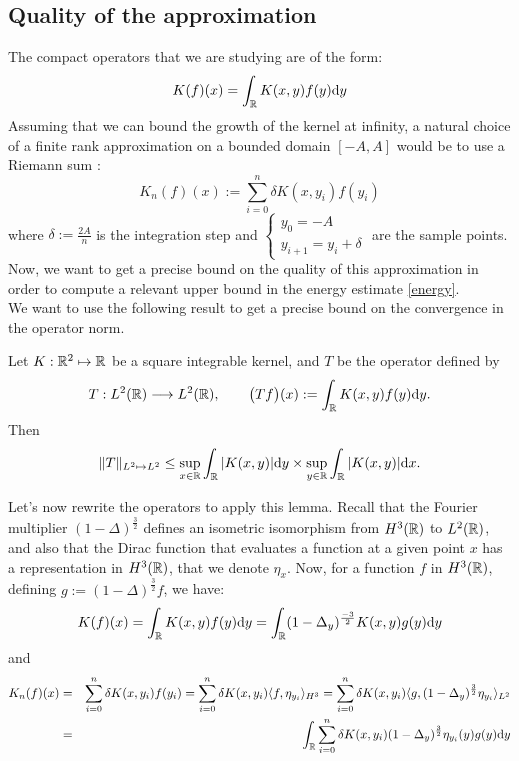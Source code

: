 \documentclass[11pt,a4paper]{article}
\begin{document}
\newpage

\subsection{ Quality of the approximation}
The compact operators that we are studying are of the form: \[K(f)(x) = \int_\mathbb R K(x,y)f(y)\mathrm{d}y \]
Assuming that we can bound the growth of the kernel at infinity, a natural choice of a finite rank approximation on a bounded domain $[-A,A]$ would be to use a Riemann sum : \[K_n(f)(x) := \sum_{i=0}^n \delta K(x,y_i)f(y_i)\]
where $\delta := \frac{2A}{n}$ is the integration step and $\begin{cases} y_0=-A \\ y_{i+1}=y_i + \delta \end{cases}$ are the sample points. \\

Now, we want to get a precise bound on the quality of this approximation in order to compute a relevant upper bound in the energy estimate \ref{energy}. \\
We want to use the following result to get a precise bound on the convergence in the operator norm.
\begin{lemma}\label{schur}
Let $K: \mathbb R^2 \mapsto \mathbb R$ be a square integrable kernel, and $T$ be the operator defined by 
\[ T: L^2(\mathbb R) \longrightarrow L^2(\mathbb R), \qquad \big(Tf\big)(x) := \int_{\mathbb R}K(x,y) f(y)\mathrm{d}y. \] 
Then \[\displaystyle \|T\|_{L^2\mapsto L^2} \leq \sup_{x\in \mathbb R} \int_\mathbb R |K(x,y)|\mathrm{d}y\times  \sup_{y\in \mathbb R} \int_\mathbb R |K(x,y)|\mathrm{d}x.\] 
\end{lemma}

Let's now rewrite the operators to apply this lemma. Recall that the Fourier multiplier $(1-\Delta)^\frac{3}{2}$ defines an isometric isomorphism from $H^3(\mathbb R)$ to $L^2(\mathbb R)$, and also that the Dirac function that evaluates a function at a given point $x$ has a representation in $H^3(\mathbb R)$, that we denote $\eta_x$. Now, for a function $f$ in $H^3(\mathbb R)$, defining $g:=(1-\Delta)^\frac{3}{2}f$, we have: 
\[K(f)(x) = \int_\mathbb R K(x,y)f(y)\mathrm{d}y = \int_\mathbb R(1-\Delta_y)^\frac{-3}{2} K(x,y)g(y)\mathrm{d}y\]
and 
\begin{eqnarray*}
K_n(f)(x) &=& \sum_{i=0}^n \delta K(x,y_i)f(y_i) = \sum_{i=0}^n \delta K(x,y_i)\langle f, \eta_{y_i} \rangle_{H^3} =   \sum_{i=0}^n \delta K(x,y_i)\langle g, (1-\Delta_y)^\frac{3}{2}\eta_{y_i} \rangle_{L^2} \\
&=&\int_\mathbb R \sum_{i=0}^n \delta K(x,y_i)(1-\Delta_y)^\frac{3}{2}\eta_{y_i}(y)g(y)\mathrm{d}y 
\end{eqnarray*} 
\end{document}
